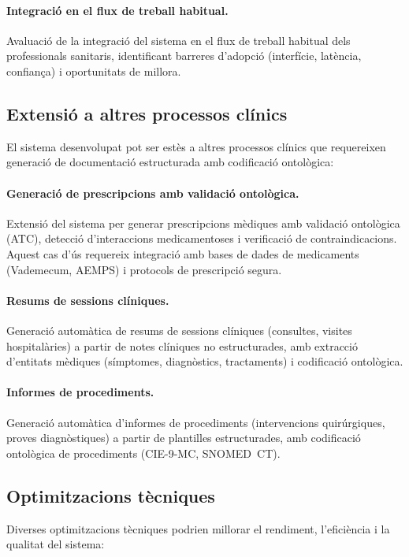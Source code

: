 \documentclass[CAT]{TFUOC}%
\begin{document}
\paragraph{Integració en el flux de treball habitual.}
Avaluació de la integració del sistema en el flux de treball habitual dels professionals sanitaris, identificant barreres d'adopció (interfície, latència, confiança) i oportunitats de millora.

\subsection{Extensió a altres processos clínics}

El sistema desenvolupat pot ser estès a altres processos clínics que requereixen generació de documentació estructurada amb codificació ontològica:

\paragraph{Generació de prescripcions amb validació ontològica.}
Extensió del sistema per generar prescripcions mèdiques amb validació ontològica (ATC), detecció d'interaccions medicamentoses i verificació de contraindicacions. Aquest cas d'ús requereix integració amb bases de dades de medicaments (Vademecum, AEMPS) i protocols de prescripció segura.

\paragraph{Resums de sessions clíniques.}
Generació automàtica de resums de sessions clíniques (consultes, visites hospitalàries) a partir de notes clíniques no estructurades, amb extracció d'entitats mèdiques (símptomes, diagnòstics, tractaments) i codificació ontològica.

\paragraph{Informes de procediments.}
Generació automàtica d'informes de procediments (intervencions quirúrgiques, proves diagnòstiques) a partir de plantilles estructurades, amb codificació ontològica de procediments (CIE-9-MC, SNOMED~CT).

\subsection{Optimitzacions tècniques}

Diverses optimitzacions tècniques podrien millorar el rendiment, l'eficiència i la qualitat del sistema:
\end{document}
